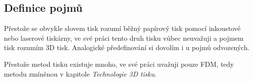 \subsection{Definice pojmů}

Přestože se obvykle slovem tisk rozumí běžný papírový tisk pomocí inkoustové nebo laserové tiskárny,
ve své práci tento druh tisku vůbec neuvažuji a pojmem tisk rozumím 3D tisk.
Analogické předefinování si dovolím i u pojmů odvozených.

Přestože metod tisku existuje mnoho, ve své práci uvažuji pouze FDM, tedy metodu zmíněnou v kapitole \textit{Technologie 3D tisku}.
